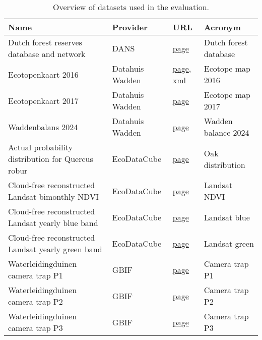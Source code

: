 \begin{table}
\caption{Overview of datasets used in the evaluation.}
\label{tab:dataset_overview}
\begin{tabular}{llll}
\toprule
Name & Provider & URL & Acronym \\
\midrule
Dutch forest reserves database and network & DANS & \href{https://lifesciences.datastations.nl/dataset.xhtml?persistentId=doi:10.17026/dans-2bd-kskz}{page} & Dutch forest database \\
Ecotopenkaart 2016 & Datahuis Wadden & \href{https://datahuiswadden.openearth.nl/geonetwork/srv/api/records/A0h06_NlSEuNlium5OO3FA}{page}, \href{https://datahuiswadden.openearth.nl/geonetwork/srv/api/records/A0h06_NlSEuNlium5OO3FA/formatters/xml}{xml} & Ecotope map 2016 \\
Ecotopenkaart 2017 & Datahuis Wadden & \href{https://datahuiswadden.openearth.nl/geonetwork/srv/eng/catalog.search#/metadata/L-mHomzGRuKAHGMkUPjY9g}{page} & Ecotope map 2017 \\
Waddenbalans 2024 & Datahuis Wadden & \href{https://datahuiswadden.openearth.nl/geonetwork/srv/eng/catalog.search#/metadata/0fe7e64b-50b3-4cee-b64a-02659fc2b6c7}{page} & Wadden balance 2024 \\
Actual probability distribution for Quercus robur & EcoDataCube & \href{https://stac.ecodatacube.eu/veg_quercus.robur_anv.eml/collection.json?.language=en}{page} & Oak distribution \\
Cloud-free reconstructed Landsat bimonthly NDVI & EcoDataCube & \href{https://stac.ecodatacube.eu/ndvi_glad.landsat.ard2.seasconv/collection.json?.language=en}{page} & Landsat NDVI \\
Cloud-free reconstructed Landsat yearly blue band & EcoDataCube & \href{https://stac.ecodatacube.eu/blue_glad.landsat.ard2.seasconv.m.yearly/collection.json}{page} & Landsat blue \\
Cloud-free reconstructed Landsat yearly green band & EcoDataCube & \href{https://stac.ecodatacube.eu/green_glad.landsat.ard2.seasconv.m.yearly/collection.json}{page} & Landsat green \\
Waterleidingduinen camera trap P1 & GBIF & \href{https://www.gbif.org/dataset/74196cd9-7ebc-4b20-bc27-3c2d22e31ed7}{page} & Camera trap P1 \\
Waterleidingduinen camera trap P2 & GBIF & \href{https://www.gbif.org/dataset/f9ba3c2e-0636-4f66-a4b5-b8c138046e9e}{page} & Camera trap P2 \\
Waterleidingduinen camera trap P3 & GBIF & \href{https://www.gbif.org/dataset/bc0acb9a-131f-4085-93ae-a46e08564ac5}{page} & Camera trap P3 \\

\end{tabular}
\end{table}
